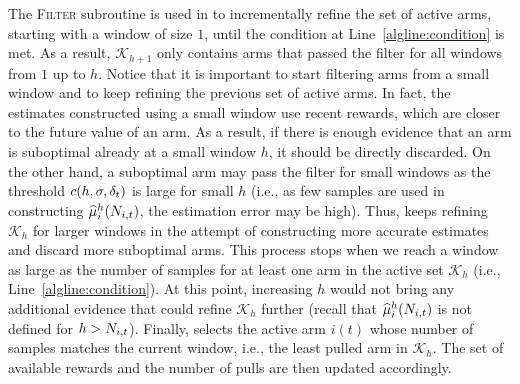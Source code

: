 The {\small\textsc{Filter}} subroutine is used in \myAlgorithm to incrementally refine the set of active arms, starting with a window of size $1$, until the condition at Line~\ref{algline:condition} is met. As a result, $\mathcal{K}_{h+1}$ only contains arms that passed the filter for all windows from $1$ up to $h$. Notice that it is important to start filtering arms from a small window and to keep refining the previous set of active arms. %
In fact, the estimates constructed using a small window use recent rewards, which are closer to the future value of an arm. As a result, if there is enough evidence that an arm is suboptimal already at a small window $h$, it should be directly discarded. On the other hand, a suboptimal arm may pass the filter for small windows as the threshold $c(h, \sigma, \delta_t)$ is large for small $h$ (i.e., as few samples are used in constructing $\widehat{\mu}^h_i(N_{i,t})$, the estimation error may be high). Thus, \myAlgorithm keeps refining $\mathcal{K}_{h}$ for larger windows in the attempt of constructing more accurate estimates and discard more suboptimal arms. This process stops when we reach a window as large as the number of samples for at least one arm in the active set $\mathcal{K}_{h}$ (i.e., Line~\ref{algline:condition}). At this point, increasing $h$ would not bring any additional evidence that could refine $\mathcal{K}_{h}$ further (recall that $\widehat{\mu}^h_i(N_{i,t})$ is not defined for $h > N_{i,t}$). Finally,  \myAlgorithm selects the active arm $i(t)$ whose number of samples matches the current window, i.e., the least pulled arm in $\mathcal{K}_{h}$. The set of available rewards and the number of pulls are then updated accordingly. 


